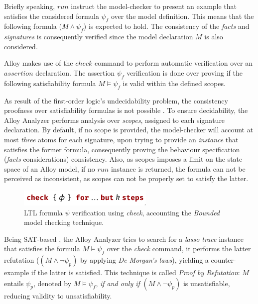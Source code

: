 Briefly speaking, $run$ instruct the model-checker to present an example that satisfies the considered formula $\psi_{f}$ over the model definition. This means that the following formula ($M \wedge \psi_{f}$) is expected to hold. The consistency of the \textit{facts} and \textit{signatures} is consequently verified since the model declaration $M$ is also considered. 

Alloy makes use of the $check$ command to perform automatic verification over an $assertion$ declaration. The assertion $\psi_{f}$ verification is done over proving if the following satisfiability formula $M \models \psi_{f}$ is valid within the defined scopes. %

As result of the first-order logic's undecidability problem, the consistency proofness over satisfiability formulas is not possible \cite{vakili2012temporal}. To ensure decidability, the Alloy Analyzer performs analysis over \textit{scopes}, assigned to each signature declaration. By default, if no scope is provided, the model-checker will account at most \textit{three} atoms for each signature, upon trying to provide an \textit{instance} that satisfies the former formula, consequently proving the behaviour specification (\textit{facts} considerations) consistency. Also, as scopes imposes a limit on the state space of an Alloy model, if no $run$ instance is returned, the formula can not be perceived as inconsistent, as scopes can not be properly set to satisfy the latter.

\begin{figure}[H]
    \centering
    \includegraphics[width=0.4\linewidth]{images/check_alloy_1.png}
    \caption{LTL formula $\psi$ verification using \textit{check}, accounting the \textit{Bounded} model checking technique.}
    \label{fig:alloy-check-1}
\end{figure}

Being SAT-based \cite{lwspecification}, the Alloy Analyzer tries to search for a \textit{lasso trace} instance that satisfies the formula $M \models \psi_{f}$ over the \textit{check} command, it performs the latter refutation ($(M \wedge \neg \psi_{p})$ by applying \textit{De Morgan's laws}), yielding a counter-example if the latter is satisfied. This technique is called \textit{Proof by Refutation}: $M$ entails $\psi_{p}$, denoted by $M \models \psi_{f}$, \textit{if and only if} $(M \wedge \neg \psi_{p})$ is unsatisfiable, reducing validity to unsatisfiability.

